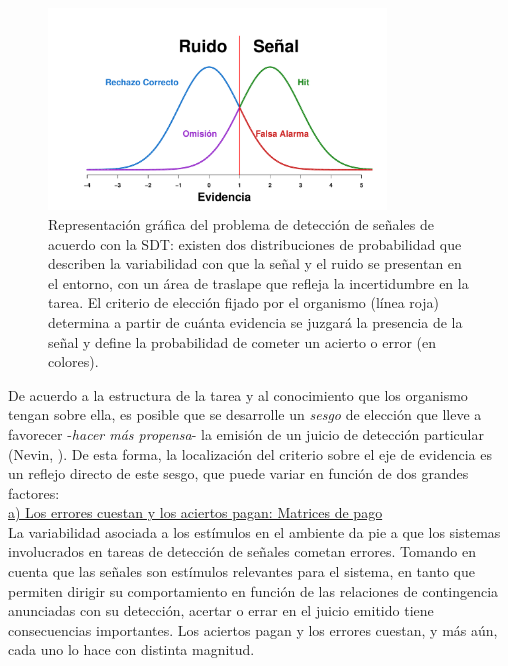 \begin{figure}[bh]
\centering
\includegraphics[width=0.8\textwidth]{Figures/SDT_OutcomesR} 
\caption[Representación gráfica de las tareas de detección y los posibles resultados a obtener]{Representación gráfica del problema de detección de señales de acuerdo con la SDT: existen dos distribuciones de probabilidad que describen la variabilidad con que la señal y el ruido se presentan en el entorno, con un área de traslape que refleja la incertidumbre en la tarea. El criterio de elección fijado por el organismo (línea roja) determina a partir de cuánta evidencia se juzgará la presencia de la señal y define la probabilidad de cometer un acierto o error (en colores).}
\label{fig:Graf_Outputs}
\end{figure}

De acuerdo a la estructura de la tarea y al conocimiento que los organismo tengan sobre ella, es posible que se desarrolle un \textit{sesgo} de elección que lleve a favorecer -\textit{hacer más propensa}- la emisión de un juicio de detección particular (Nevin, \citeyear{Nevin1969}). De esta forma, la localización del criterio sobre el eje de evidencia es un reflejo directo de este sesgo, que puede variar en función de dos grandes factores:\\

      \underline{a) Los errores cuestan y los aciertos pagan: Matrices de pago}\\

La variabilidad asociada a los estímulos en el ambiente da pie a que los sistemas involucrados en tareas de detección de señales cometan errores. Tomando en cuenta que las señales son estímulos relevantes para el sistema, en tanto que permiten dirigir su comportamiento en función de las relaciones de contingencia anunciadas con su detección, acertar o errar en el juicio emitido tiene consecuencias importantes. Los aciertos pagan y los errores cuestan, y más aún, cada uno lo hace con distinta magnitud.\\

